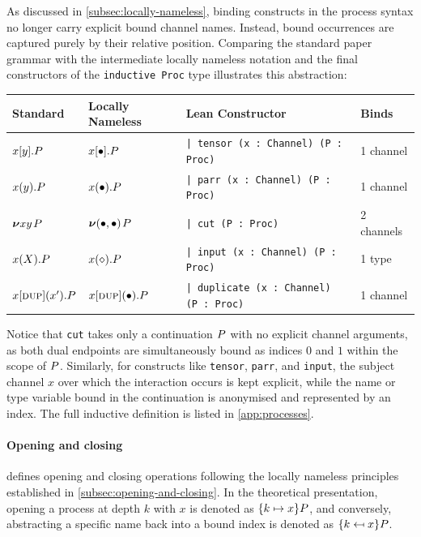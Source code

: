 As discussed in \cref{subsec:locally-nameless}, binding constructs in the process syntax no longer carry explicit bound channel names. Instead, bound occurrences are captured purely by their relative position. Comparing the standard paper grammar with the intermediate locally nameless notation and the final constructors of the \texttt{inductive Proc} type illustrates this abstraction:

\begin{highlight}  
\begin{center}
\begin{tabular}{llll}
    \toprule
    \textbf{Standard} & \textbf{Locally Nameless} & \textbf{Lean Constructor} & \textbf{Binds} \\
    \midrule
    ${{x[y]}{.}P}$ & ${{x[\bullet]}{.}P}$ & \texttt{| tensor (x~: Channel) (P~: Proc)} & 1 channel \\
    ${{x(y)}{.}P}$ & ${{x(\bullet)}{.}P}$ & \texttt{| parr (x~: Channel) (P~: Proc)} & 1 channel \\
    ${\boldsymbol{\nu}{xy}\mspace{2mu}}{P}$ & ${\boldsymbol{\nu}{(\bullet, \bullet)}\mspace{2mu}}{P}$ & \texttt{| cut (P~: Proc)} & 2 channels \\
    ${{x(X)}{.}P}$& $x(\diamond).P$ & \texttt{| input (x~: Channel) (P~: Proc)} & 1 type \\
    $\phl{\clientdup{x}{x'}{P}}$ & $\phl{\clientdup{x}{\bullet}{P}}$ & \texttt{| duplicate (x~: Channel) (P~: Proc)} & 1 channel \\
    \bottomrule
\end{tabular}
\end{center}
\end{highlight} 

Notice that \texttt{cut} takes only a continuation {$P$} with no explicit channel arguments, as both dual endpoints are simultaneously bound as indices $0$ and $1$ within the scope of {$P$}. Similarly, for constructs like \texttt{tensor}, \texttt{parr}, and \texttt{input}, the subject channel $x$ over which the interaction occurs is kept explicit, while the name or type variable bound in the continuation is anonymised and represented by an index. The full inductive definition is listed in \cref{app:processes}. 

\paragraph{Opening and closing}  defines opening and closing operations following the locally nameless principles established in \cref{subsec:opening-and-closing}. In the theoretical presentation, opening a process at depth $k$ with $x$ is denoted as {$\{k \mapsto x\}P$}, and conversely, abstracting a specific name back into a bound index is denoted as {$\{k \mapsfrom x\}P$}. 

